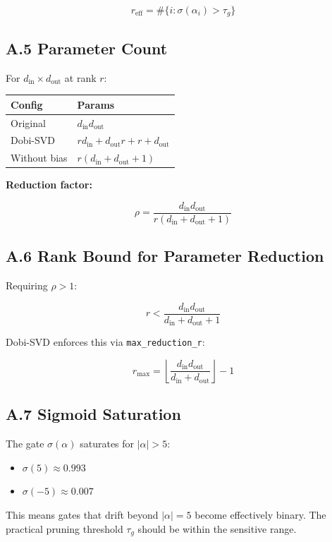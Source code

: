 \[
r_\text{eff} = \#\{i : \sigma(\alpha_i) > \tau_g\}
\tag{A.4}
\]

\subsection{A.5 Parameter Count}

For $d_\text{in} \times d_\text{out}$ at rank $r$:

\begin{table}[H]
\centering
\small
\begin{tabular}{ll}
\toprule
\textbf{Config} & \textbf{Params} \\
\midrule
Original & $d_\text{in} d_\text{out}$ \\
Dobi-SVD & $r d_\text{in} + d_\text{out} r + r + d_\text{out}$ \\
Without bias & $r(d_\text{in} + d_\text{out} + 1)$ \\
\bottomrule
\end{tabular}
\end{table}

\textbf{Reduction factor:}

\[
\rho = \frac{d_\text{in} d_\text{out}}{r(d_\text{in} + d_\text{out} + 1)}
\tag{A.5}
\]

\subsection{A.6 Rank Bound for Parameter Reduction}

Requiring $\rho > 1$:

\[
r < \frac{d_\text{in} d_\text{out}}{d_\text{in} + d_\text{out} + 1}
\tag{A.6}
\]

Dobi-SVD enforces this via \texttt{max\_reduction\_r}:

\[
r_\text{max} = \left\lfloor \frac{d_\text{in} d_\text{out}}{d_\text{in} + d_\text{out}} \right\rfloor - 1
\tag{A.7}
\]

\subsection{A.7 Sigmoid Saturation}

The gate $\sigma(\alpha)$ saturates for $|\alpha| > 5$:

\begin{itemize}
\item $\sigma(5) \approx 0.993$
\item $\sigma(-5) \approx 0.007$

\end{itemize}
This means gates that drift beyond $|\alpha| = 5$ become effectively binary. 
The practical pruning threshold $\tau_g$ should be within the sensitive range.

